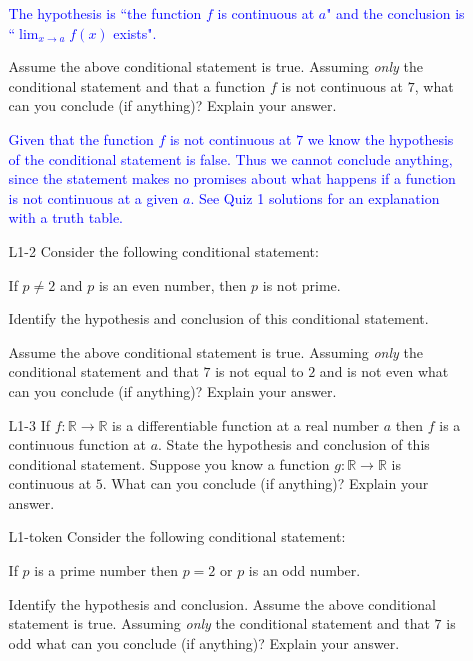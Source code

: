 \documentclass[11pt]{article}
\begin{document}
\begin{itemize}
\begin{enumerate}
	\textcolor{blue}{The hypothesis is ``the function $f$ is continuous at $a$" and the conclusion is ``$\displaystyle{\lim_{x\to a} f(x)}$ exists".}
	
Assume the above conditional statement is true. Assuming \emph{only} the conditional statement and that a function $f$ is not continuous at $7$, what can you conclude (if anything)?  Explain your answer.

	\textcolor{blue}{Given that the function $f$ is not continuous at $7$ we know the hypothesis of the conditional statement is false. Thus we cannot conclude anything, since the statement makes no promises about what happens if a function is not continuous at a given $a$. See Quiz 1 solutions for an explanation with a truth table.}
	
\item[L1-2] Consider the following conditional statement: 
	\begin{center}
	If $p\neq 2$ and $p$ is an even number, then $p$ is not prime.
\end{center}
	Identify the hypothesis and conclusion of this conditional statement.
	
Assume the above conditional statement is true. Assuming \emph{only} the conditional statement and that $7$ is not equal to $2$ and is not even what can you conclude (if anything)?  Explain your answer.
	

	\item[L1-3] If $f: \mathbb{R}\to\mathbb{R}$ is a differentiable function at a real number $a$ then $f$ is a continuous function at $a$.  State the hypothesis and conclusion of this conditional statement.  Suppose you know a function $g: \mathbb{R}\to\mathbb{R}$ is continuous at $5$.  What can you conclude (if anything)?  Explain your answer.
	

	\item[L1-token]  Consider the following conditional statement:
	\begin{center}
	If $p$ is a prime number then $p=2$ or $p$ is an odd number.
	\end{center}
	Identify the hypothesis and conclusion. 
	Assume the above conditional statement is true. Assuming \emph{only} the conditional statement and that $7$ is odd what can you conclude (if anything)?  Explain your answer.
	




	\end{enumerate}
	
	
	\newpage
	


\end{itemize}
\end{document}
